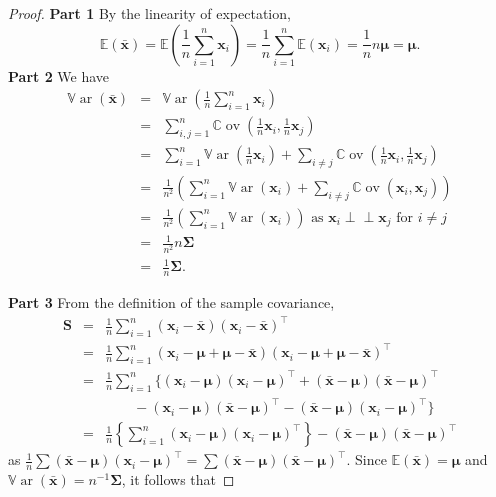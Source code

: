 \documentclass[]{book}
\theoremstyle{definition}
\theoremstyle{definition}
\theoremstyle{definition}
\theoremstyle{remark}
\begin{document}
\begin{proof}
{}\textbf{Part 1} By the linearity of expectation,
\[{\mathbb{E}}(\bar{\boldsymbol x}) = {\mathbb{E}}\left(\frac{1}{n} \sum_{i=1}^n \boldsymbol x_i \right)= \frac{1}{n} \sum_{i=1}^n {\mathbb{E}}(\boldsymbol x_i) = \frac{1}{n} n \boldsymbol \mu= \boldsymbol \mu.\]
\textbf{Part 2}
We have
\begin{eqnarray*}
{\mathbb{V}\operatorname{ar}}(\bar{\boldsymbol x}) &=& {\mathbb{V}\operatorname{ar}}\left(\frac{1}{n} \sum_{i=1}^n \boldsymbol x_i \right)\\
&=& \sum_{i,j=1}^n {\mathbb{C}\operatorname{ov}}\left (\frac{1}{n}\boldsymbol x_i, \frac{1}{n}\boldsymbol x_j \right)\\
&=& \sum_{i=1}^n {\mathbb{V}\operatorname{ar}}\left(\frac{1}{n} \boldsymbol x_i \right)+ \sum_{i \neq j} {\mathbb{C}\operatorname{ov}}\left(\frac{1}{n} \boldsymbol x_i, \frac{1}{n} \boldsymbol x_j \right)\\
&=& \frac{1}{n^2} \left(\sum_{i=1}^n {\mathbb{V}\operatorname{ar}}(\boldsymbol x_i) + \sum_{i \neq j} {\mathbb{C}\operatorname{ov}}(\boldsymbol x_i,\boldsymbol x_j) \right)\\
&=& \frac{1}{n^2} \left(\sum_{i=1}^n {\mathbb{V}\operatorname{ar}}(\boldsymbol x_i) \right)\mbox{ as } \boldsymbol x_i \perp \!\!\! \perp\boldsymbol x_j \mbox{ for } i\not = j\\
&=& \frac{1}{n^2} n \boldsymbol \Sigma\\
&=& \frac{1}{n} \boldsymbol \Sigma.
\end{eqnarray*}

\textbf{Part 3} From the definition of the sample covariance,
\begin{eqnarray*}
\boldsymbol S&=& \frac{1}{n} \sum_{i=1}^n  (\boldsymbol x_i -\bar{\boldsymbol x})( \boldsymbol x_i - \bar{\boldsymbol x})^\top \\
&=& \frac{1}{n} \sum_{i=1}^n (\boldsymbol x_i - \boldsymbol \mu+ \boldsymbol \mu-\bar{\boldsymbol x})(\boldsymbol x_i - \boldsymbol \mu+\boldsymbol \mu-\bar{\boldsymbol x})^\top  \\
&=& \frac{1}{n} \sum_{i=1}^n \bigg \{(\boldsymbol x_i - \boldsymbol \mu)(\boldsymbol x_i - \boldsymbol \mu)^\top +(\bar{\boldsymbol x}-\boldsymbol \mu)(\bar{\boldsymbol x}-\boldsymbol \mu)^\top \\
&&  \qquad -(\boldsymbol x_i-\boldsymbol \mu)(\bar{\boldsymbol x}-\boldsymbol \mu)^\top -(\bar{\boldsymbol x}-\boldsymbol \mu)(\boldsymbol x_i-\boldsymbol \mu)^\top \bigg \}\\
&=& \frac{1}{n} \left \{\sum_{i=1}^n (\boldsymbol x_i - \boldsymbol \mu)(\boldsymbol x_i - \boldsymbol \mu)^\top \right \}- (\bar{\boldsymbol x}-\boldsymbol \mu)(\bar{\boldsymbol x}-\boldsymbol \mu)^\top
\end{eqnarray*}
as \(\frac{1}{n}\sum (\bar{\boldsymbol x}-\boldsymbol \mu)(\boldsymbol x_i-\boldsymbol \mu)^\top = \sum (\bar{\boldsymbol x}-\boldsymbol \mu)(\bar{\boldsymbol x} -\boldsymbol \mu)^\top\).
Since \({\mathbb{E}}(\bar{\boldsymbol x})=\boldsymbol \mu\) and \({\mathbb{V}\operatorname{ar}}(\bar{\boldsymbol x})=n^{-1}\boldsymbol \Sigma\), it follows that


\end{proof}
\end{document}
